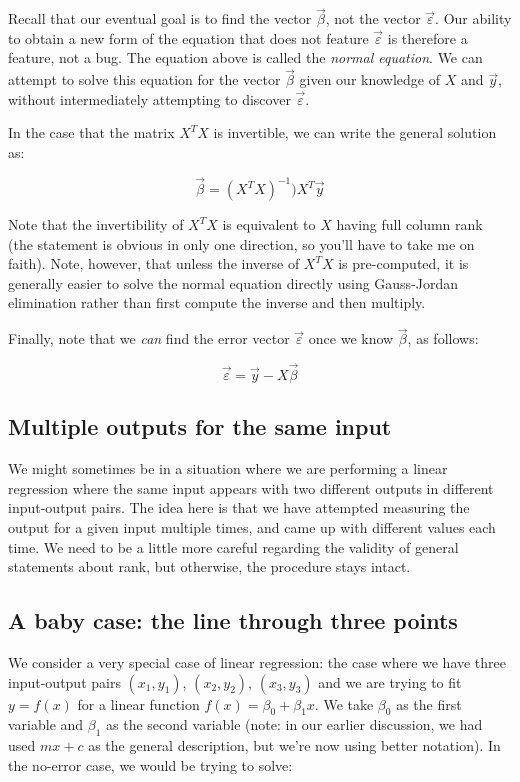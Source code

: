 \documentclass[10pt]{amsart}
\begin{document}
Recall that our eventual goal is to find the vector $\vec{\beta}$, not
the vector $\vec{\varepsilon}$. Our ability to obtain a new form of
the equation that does not feature $\vec{\varepsilon}$ is therefore a
feature, not a bug. The equation above is called the {\em normal
  equation}. We can attempt to solve this equation for the vector
$\vec{\beta}$ given our knowledge of $X$ and $\vec{y}$, without
intermediately attempting to discover $\vec{\varepsilon}$. 

In the case that the matrix $X^TX$ is invertible, we can write the
general solution as:

$$\vec{\beta} = (X^TX)^{-1})X^T\vec{y}$$

Note that the invertibility of $X^TX$ is equivalent to $X$ having full
column rank (the statement is obvious in only one direction, so you'll
have to take me on faith). Note, however, that unless the inverse of
$X^TX$ is pre-computed, it is generally easier to solve the normal
equation directly using Gauss-Jordan elimination rather than first
compute the inverse and then multiply.

Finally, note that we {\em can} find the error vector
$\vec{\varepsilon}$ once we know $\vec{\beta}$, as follows:

$$\vec{\varepsilon} = \vec{y} - X \vec{\beta}$$

\subsection{Multiple outputs for the same input}

We might sometimes be in a situation where we are performing a linear
regression where the same input appears with two different outputs in
different input-output pairs. The idea here is that we have attempted
measuring the output for a given input multiple times, and came up
with different values each time. We need to be a little more careful
regarding the validity of general statements about rank, but
otherwise, the procedure stays intact.

\subsection{A baby case: the line through three points}

We consider a very special case of linear regression: the case where
we have three input-output pairs $(x_1,y_1)$, $(x_2,y_2)$, $(x_3,y_3)$
and we are trying to fit $y = f(x)$ for a linear function $f(x) =
\beta_0 + \beta_1x$. We take $\beta_0$ as the first variable and
$\beta_1$ as the second variable (note: in our earlier discussion, we
had used $mx + c$ as the general description, but we're now using
better notation). In the no-error case, we would be trying to solve:
\end{document}
